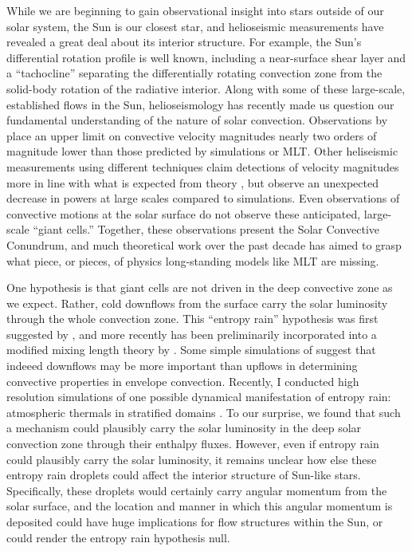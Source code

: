 \documentclass[aasms,12pt]{article}
\begin{document}
While we are beginning to gain observational insight into stars outside of our solar system, the Sun is our closest star, and helioseismic measurements have revealed a great deal about its interior structure.
For example, the Sun's differential rotation profile is well known, including a near-surface shear layer and a ``tachocline'' separating the differentially rotating convection zone from the solid-body rotation of the radiative interior.
Along with some of these large-scale, established flows in the Sun, helioseismology has recently made us question our fundamental understanding of the nature of solar convection.
Observations by \citet{hanasoge&all2012} place an upper limit on convective velocity magnitudes nearly two orders of magnitude lower than those predicted by simulations or MLT.
Other heliseismic measurements using different techniques claim detections of velocity magnitudes more in line with what is expected from theory \citep{greer&all2015}, but observe an unexpected decrease in powers at large scales compared to simulations.
Even observations of convective motions at the solar surface \citep{hathaway&all2015} do not observe these anticipated, large-scale ``giant cells.''
Together, these observations present the Solar Convective Conundrum, and much theoretical work over the past decade has aimed to grasp what piece, or pieces, of physics long-standing models like MLT are missing.

One hypothesis is that giant cells are not driven in the deep convective zone as we expect.
Rather, cold downflows from the surface carry the solar luminosity through the whole convection zone.
This ``entropy rain'' hypothesis was first suggested by \citet{spruit1997}, and more recently has been preliminarily incorporated into a modified mixing length theory by \citet{brandenburg2016}.
Some simple simulations of \citet{kapyla&all2017} suggest that indeeed downflows may be more important than upflows in determining convective properties in envelope convection.
Recently, I conducted high resolution simulations of one possible dynamical manifestation of entropy rain: atmospheric thermals in stratified domains \citep{andersLB2019}.
To our surprise, we found that such a mechanism could plausibly carry the solar luminosity in the deep solar convection zone through their enthalpy fluxes.
However, even if entropy rain could plausibly carry the solar luminosity, it remains unclear how else these entropy rain droplets could affect the interior structure of Sun-like stars.
Specifically, these droplets would certainly carry angular momentum from the solar surface, and the location and manner in which this angular momentum is deposited could have huge implications for flow structures within the Sun, or could render the entropy rain hypothesis null.
\end{document}
